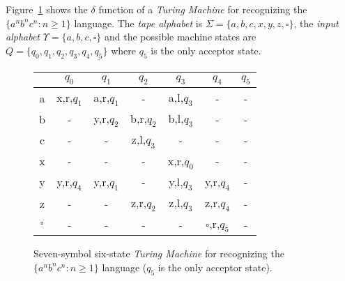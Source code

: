 \documentclass[letterpaper]{article} %
\begin{document}
Figure~\ref{tab:tm-anbncn} shows the $\delta$ function of a {\em Turing Machine} for recognizing the $\{a^nb^nc^n : n \geq 1 \}$ language. The {\em tape alphabet} is $\Sigma=\{a,b,c,x,y,z,\square\}$, the {\em input alphabet} $\Upsilon=\{a,b,c,\square\}$ and the possible machine states are $Q=\{q_0,q_1,q_2,q_3,q_4,\underline{q_5}\}$ where \underline{$q_5$} is the only acceptor state.

\begin{figure}
\begin{center}
    \begin{tabular}{| c || c | c | c | c | c | c |}
    \hline
      & $q_0$ & $q_1$ & $q_2$ & $q_3$ & $q_4$ & \underline{$q_5$} \\ \hline\hline
    a & x,r,$q_1$ & a,r,$q_1$ & - &  a,l,$q_3$ & - & - \\ \hline
    b & - & y,r,$q_2$ & b,r,$q_2$ & b,l,$q_3$ & - & - \\ \hline
    c & - & - & z,l,$q_3$ & - & - & - \\ \hline
    x & - & - & - & x,r,$q_0$ & - & - \\ \hline
    y & y,r,$q_4$ & y,r,$q_1$ & - & y,l,$q_3$ & y,r,$q_4$ & - \\ \hline
    z & - & - & z,r,$q_2$ & z,l,$q_3$ & z,r,$q_4$ & - \\\hline
    $\square$ & - & - & - & - & $\square$,r,$q_5$  & - \\                
    \hline
    \end{tabular}
\end{center}
  \caption{\small Seven-symbol six-state {\em Turing Machine} for recognizing the $\{a^nb^nc^n : n \geq 1 \}$ language (\underline{$q_5$} is the only acceptor state).}
  \label{tab:tm-anbncn}
\end{figure}
\end{document}
